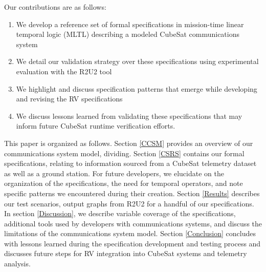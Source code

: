 \documentclass[conf]{new-aiaa}
\begin{document}
Our contributions are as follows:

\begin{enumerate}
  \item We develop a reference set of formal specifications in mission-time linear temporal logic (MLTL) describing a modeled CubeSat communications system
  \item We detail our validation strategy over these specifications using experimental evaluation with the R2U2 tool
  \item We highlight and discuss specification patterns that emerge while developing and revising the RV specifications
  \item We discuss lessons learned from validating these specifications that may inform future CubeSat runtime verification efforts.
\end{enumerate}

This paper is organized as follows. Section \ref{CCSM} provides an overview of our communications system model, dividing. Section \ref{CSRS} contains our formal specifications, relating to information sourced from a CubeSat telemetry dataset as well as a ground station. For future developers, we elucidate on the organization of the specifications, the need for temporal operators, and note specific patterns we encountered during their creation. Section \ref{Results} describes our test scenarios, output graphs from R2U2 for a handful of our specifications. In section \ref{Discussion}, we describe variable coverage of the specifications, additional tools used by developers with communications systems, and discuss the limitations of the communications system model. Section \ref{Conclusion} concludes with lessons learned during the specification development and testing process and discusses future steps for RV integration into CubeSat systems and telemetry analysis.



\end{document}
